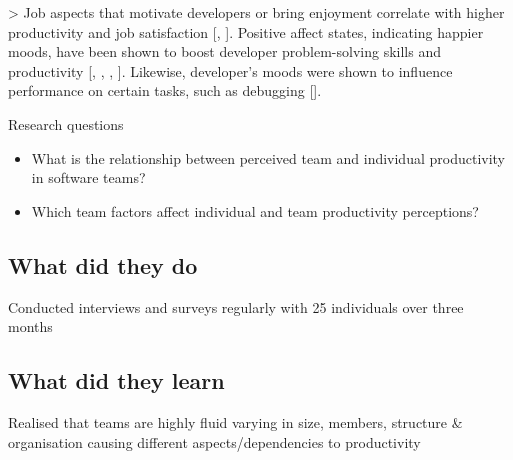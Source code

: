 > Job aspects that motivate developers or bring enjoyment correlate with higher productivity and job satisfaction [\cite{beechamMotivationSoftwareEngineering2008}, \cite{kimUnderstandingPersonalProductivity2019}]. Positive affect states, indicating happier moods, have been shown to boost developer problem-solving skills and productivity [\cite{amabileProgressPrincipleUsing2011}, \cite{graziotinFeelingsMatterCorrelation2015}, \cite{meyerSoftwareDevelopersPerceptions2014}, \cite{mullerStuckFrustratedFlow2015}]. Likewise, developer’s moods were shown to influence performance on certain tasks, such as debugging [\cite{khanMoodsAffectProgrammers2011}].

Research questions

\begin{itemize}
    \item What is the relationship between perceived team and individual productivity in software teams?
    \item Which team factors affect individual and team productivity perceptions?
\end{itemize}

\subsection{What did they do}

Conducted interviews and surveys regularly with 25 individuals over three months

\subsection{What did they learn}

Realised that teams are highly fluid varying in size, members, structure & organisation causing different aspects/dependencies to productivity
